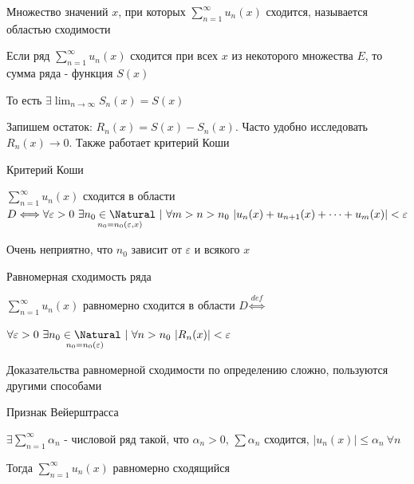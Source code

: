 \documentclass[12pt]{article}
\begin{document}
    \Def Множество значений $x$, при которых $\sum_{n = 1}^\infty u_n(x)$ сходится, называется областью сходимости

    \hypertarget{functionalseriesconvergence}{}

    \Defs Если ряд $\sum_{n = 1}^\infty u_n(x)$ сходится при всех $x$ из некоторого множества $E$, то сумма ряда -
    функция $S(x)$

    \Nota То есть $\exists \lim_{n \to \infty} S_n(x) = S(x)$

    Запишем остаток: $R_n(x) = S(x) - S_n(x)$. Часто удобно исследовать $R_n(x) \to 0$. Также работает критерий Коши

    \begin{MyTheorem}
        \Ths Критерий Коши

        $\sum_{n = 1}^\infty u_n(x)$ сходится в области $D \Longleftrightarrow
        \forall \varepsilon > 0 \ \exists \underset{n_0 = n_0(\varepsilon, x)}{n_0 \in \Natural} \ | \
        \forall m > n > n_0 \ |u_n(x) + u_{n + 1}(x) + \dots + u_m(x)| < \varepsilon$
    \end{MyTheorem}

    \Notas Очень неприятно, что $n_0$ зависит от $\varepsilon$ и всякого $x$

    \hypertarget{uniformconvergence}{}

    \Def Равномерная сходимость ряда

    $\sum_{n = 1}^\infty u_n(x)$ равномерно сходится в области $D \overset{def}{\Longleftrightarrow}$

    $\forall \varepsilon > 0 \ \exists \underset{n_0 = n_0(\varepsilon)}{n_0 \in \Natural} \ | \ \forall n > n_0 \ |R_n(x)| < \varepsilon$

    \Nota Доказательства равномерной сходимости по определению сложно, пользуются другими способами

    \hypertarget{weierstrassign}{}

    \begin{MyTheorem}
        \Ths Признак Вейерштрасса

        $\exists \sum_{n = 1}^\infty \alpha_n$ - числовой ряд такой, что $\alpha_n > 0$, $\sum \alpha_n$ сходится,
        $|u_n(x)| \leq \alpha_n \ \forall n$

        Тогда $\sum_{n = 1}^\infty u_n(x)$ равномерно сходящийся

    \end{MyTheorem}

    \hypertarget{majorseries}{}
\end{document}
